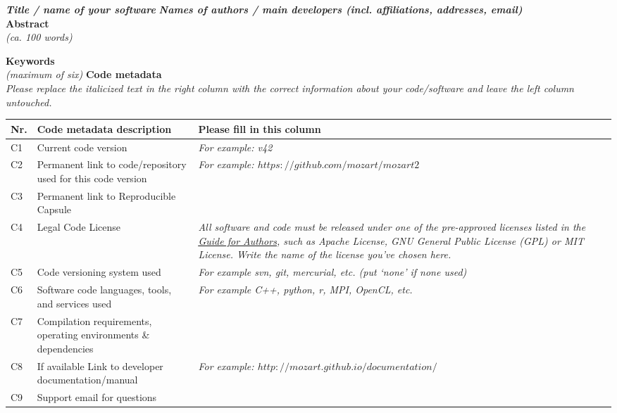 \documentclass[11pt, letterpaper]{article}
\begin{document}
\noindent
\textbf{\textit{Title / name of your software}}
\vskip0.5cm
\noindent
\textbf{\textit{Names of authors / main developers (incl. affiliations, addresses, email)}}\\

\noindent
\textbf{Abstract}\\
\textit{(ca. 100 words)}
\vskip0.5cm

\noindent
\textbf{Keywords}\\
\textit{(maximum of six)}
\vskip0.5cm
\newpage
\noindent
\textbf{Code metadata}\\
\textit{Please replace the italicized text in the right column with the correct information about your code/software and leave the left column untouched.}\\

\noindent
\begin{tabular}{|l|p{6.5cm}|p{9.5cm}|}
\hline
\textbf{Nr.} & \textbf{Code metadata description} & \textbf{Please fill in this column} \\
\hline
C1 & Current code version & \textit{For example: v42} \\
\hline
C2 & Permanent link to code/repository used for this code version & \textit{For example: \underline{$https://github.com/mozart/mozart2$}} \\
\hline
C3  & Permanent link to Reproducible Capsule & \\
\hline
C4 & Legal Code License   & \textit{All software and code must be released under one of the pre-approved licenses listed in the \href{https://www.elsevier.com/journals/software-impacts/2665-9638/guide-for-authors}{\underline{Guide for Authors}}, such as Apache License, GNU General Public License (GPL) or MIT License. Write the name of the license you’ve chosen here.} \\
\hline
C5 & Code versioning system used & \textit{For example svn, git, mercurial, etc. (put ‘none’ if none used)} \\
\hline
C6 & Software code languages, tools, and services used & \textit{For example C++, python, r, MPI, OpenCL, etc. }\\
\hline
C7 & Compilation requirements, operating environments \& dependencies & \\
\hline
C8 & If available Link to developer documentation/manual & \textit{For example: \underline{$http://mozart.github.io/documentation/$} }\\
\hline
C9 & Support email for questions & \\
\hline
\end{tabular}\\
\end{document}
